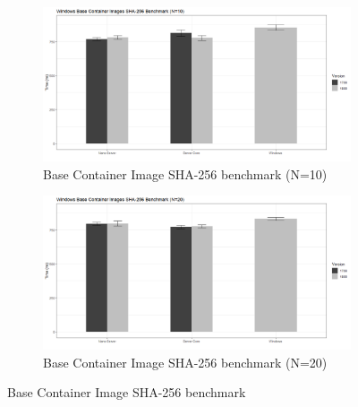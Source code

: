 \begin{figure}[h]
	\begin{subfigure}{\textwidth}
	\captionsetup{width=0.8\linewidth}
	\includegraphics[width=0.9\linewidth]{img/Methodologie/Containers4.png}
	\centering
	\caption{Base Container Image SHA-256 benchmark (N=10)}
	\end{subfigure}
	\begin{subfigure}{\textwidth}
	\captionsetup{width=0.8\linewidth}
	\includegraphics[width=0.9\linewidth]{img/Methodologie/Containers2.png}
	\centering
	\caption{Base Container Image SHA-256 benchmark (N=20)}
	\end{subfigure}
	\label{fig:SHABenchmark}
	\caption[SHA-256 benchmark]{Base Container Image SHA-256 benchmark}
\end{figure}